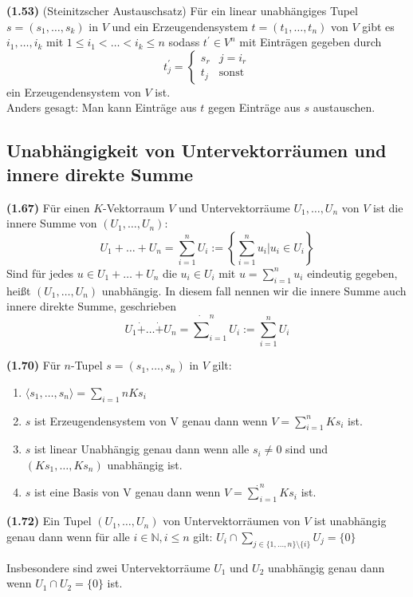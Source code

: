 \documentclass[11pt]{scrartcl}
\newlength{\hangwidth}
\newcommand{\skript}[1]{\settowidth{\hangwidth}{\textbf{(#1)} }\hangpara{\hangwidth}{1}\textbf{(#1)} }%
\begin{document}
\skript{1.53} (Steinitzscher Austauschsatz) Für ein linear unabhängiges Tupel $s = (s_1,\ldots,s_k)$ in $V$ und ein Erzeugendensystem $t=(t_1,\ldots,t_n)$ von $V$ gibt es $i_1,\ldots,i_k$ mit $1 \le i_1 < \ldots < i_k \le n$ sodass $t^\prime \in V^n$ mit Einträgen gegeben durch
$$t^\prime_j = \left\{\begin{array}{lr}
		s_r	&	j = i_r\\
		t_j	&	\text{sonst}
	\end{array}\right.$$
ein Erzeugendensystem von $V$ ist.\\
Anders gesagt: Man kann Einträge aus $t$ gegen Einträge aus $s$ austauschen.

\subsection{Unabhängigkeit von Untervektorräumen und innere direkte Summe}

\skript{1.67} Für einen $K$-Vektorraum $V$ und Untervektorräume $U_1,\ldots,U_n$ von $V$ ist die innere Summe von $(U_1,\ldots,U_n)$:
$$ U_1 + \ldots + U_n =  \sum_{i = 1}^n U_i := \left\{ \sum_{i=1}^n u_i \vert u_i \in U_i \right\}$$
Sind für jedes $u \in U_1 + \ldots + U_n$ die $u_i \in U_i$ mit $u = \sum_{i=1}^n u_i$ eindeutig gegeben, heißt $(U_1,\ldots,U_n)$ unabhängig. In diesem fall nennen wir die innere Summe auch innere direkte Summe, geschrieben
$$ U_1 \dot+ \ldots \dot+ U_n = \dot\sum_{i=1}^n U_i := \sum_{i=1}^n U_i$$

\skript{1.70} Für $n$-Tupel $s = (s_1,\ldots,s_n)$ in $V$ gilt:
\begin{enumerate}
	\item $\langle s_1,\ldots,s_n\rangle = \sum_{i=1}{n} Ks_i$
	\item $s$ ist Erzeugendensystem von V genau dann wenn $V = \sum_{i=1}^n Ks_i$ ist.
	\item $s$ ist linear Unabhängig genau dann wenn alle $s_i \neq 0$ sind und $(Ks_1,\ldots,Ks_n)$ unabhängig ist.
	\item $s$ ist eine Basis von V genau dann wenn $V = \dot\sum_{i=1}^n Ks_i$ ist.
\end{enumerate}

\skript{1.72} Ein Tupel $(U_1,\ldots,U_n)$ von Untervektorräumen von $V$ ist unabhängig genau dann wenn für alle $i \in \mathbb{N}, i \le n$ gilt: $U_i \cap \sum_{j \in \{1,\ldots,n\}\setminus\{i\}} U_j = \{0\}$

Insbesondere sind zwei Untervektorräume $U_1$ und $U_2$ unabhängig genau dann wenn $U_1 \cap U_2 = \{0\}$ ist.
\end{document}

